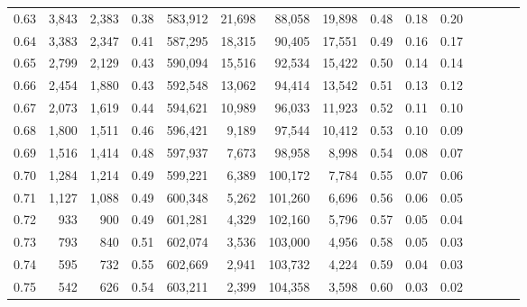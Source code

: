 \begin{tabular}{rrrcrrrrrrrrrrr}
0.63 &   3,843 &  2,383 &                                       0.38 &  583,912 &   21,698 &   88,058 &   19,898 &  0.48 &  0.18 &                         0.20 \\
0.64 &   3,383 &  2,347 &                                       0.41 &  587,295 &   18,315 &   90,405 &   17,551 &  0.49 &  0.16 &                         0.17 \\
0.65 &   2,799 &  2,129 &                                       0.43 &  590,094 &   15,516 &   92,534 &   15,422 &  0.50 &  0.14 &                         0.14 \\
0.66 &   2,454 &  1,880 &                                       0.43 &  592,548 &   13,062 &   94,414 &   13,542 &  0.51 &  0.13 &                         0.12 \\
0.67 &   2,073 &  1,619 &                                       0.44 &  594,621 &   10,989 &   96,033 &   11,923 &  0.52 &  0.11 &                         0.10 \\
0.68 &   1,800 &  1,511 &                                       0.46 &  596,421 &    9,189 &   97,544 &   10,412 &  0.53 &  0.10 &                         0.09 \\
0.69 &   1,516 &  1,414 &                                       0.48 &  597,937 &    7,673 &   98,958 &    8,998 &  0.54 &  0.08 &                         0.07 \\
0.70 &   1,284 &  1,214 &                                       0.49 &  599,221 &    6,389 &  100,172 &    7,784 &  0.55 &  0.07 &                         0.06 \\
0.71 &   1,127 &  1,088 &                                       0.49 &  600,348 &    5,262 &  101,260 &    6,696 &  0.56 &  0.06 &                         0.05 \\
0.72 &     933 &    900 &                                       0.49 &  601,281 &    4,329 &  102,160 &    5,796 &  0.57 &  0.05 &                         0.04 \\
0.73 &     793 &    840 &                                       0.51 &  602,074 &    3,536 &  103,000 &    4,956 &  0.58 &  0.05 &                         0.03 \\
0.74 &     595 &    732 &                                       0.55 &  602,669 &    2,941 &  103,732 &    4,224 &  0.59 &  0.04 &                         0.03 \\
0.75 &     542 &    626 &                                       0.54 &  603,211 &    2,399 &  104,358 &    3,598 &  0.60 &  0.03 &                         0.02 \\

\end{tabular}
